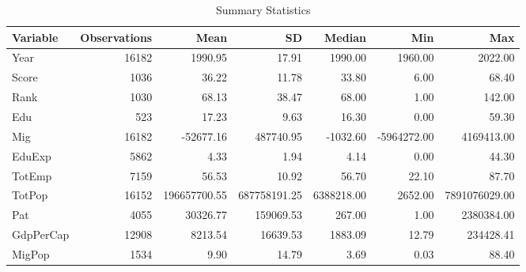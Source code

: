 \documentclass[100pt]{article}
\begin{document}
\begin{table}
    \centering
    \begin{tabular}{lrrrrrr}
        \hline
        Variable    & Observations & Mean          & SD            & Median        & Min           & Max           \\
        \hline
        Year        & 16182        & 1990.95       & 17.91        & 1990.00       & 1960.00       & 2022.00       \\
        Score       & 1036         & 36.22         & 11.78        & 33.80         & 6.00          & 68.40         \\
        Rank        & 1030         & 68.13         & 38.47        & 68.00         & 1.00          & 142.00        \\
        Edu         & 523          & 17.23         & 9.63         & 16.30         & 0.00          & 59.30         \\
        Mig         & 16182        & -52677.16     & 487740.95    & -1032.60      & -5964272.00   & 4169413.00    \\
        EduExp      & 5862         & 4.33          & 1.94         & 4.14          & 0.00          & 44.30         \\
        TotEmp      & 7159         & 56.53         & 10.92        & 56.70         & 22.10         & 87.70         \\
        TotPop      & 16152        & 196657700.55  & 687758191.25 & 6388218.00    & 2652.00       & 7891076029.00\\
        Pat         & 4055         & 30326.77      & 159069.53    & 267.00        & 1.00          & 2380384.00    \\
        GdpPerCap   & 12908        & 8213.54       & 16639.53     & 1883.09       & 12.79         & 234428.41     \\
        MigPop      & 1534         & 9.90          & 14.79        & 3.69          & 0.03          & 88.40         \\
        \hline
    \end{tabular}
    \caption{Summary Statistics}
    \label{tab:summary_statistics}
\end{table}
\end{document}
